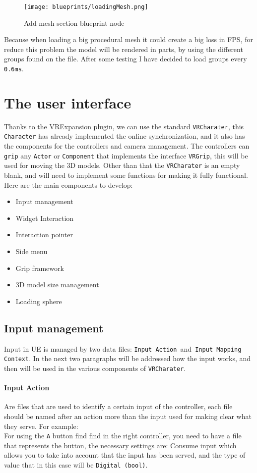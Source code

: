 \begin{figure}[h]
    \centering
    \texttt{[image: blueprints/loadingMesh.png]}
    \caption{Add mesh section blueprint node}
    \label{fig:loadingMesh}
\end{figure}
\noindent
Because when loading a big procedural mesh it could create a big loss in \ac{FPS}, for reduce this problem the model will be rendered in parts, by using the different groups found on the file. After some testing I have decided to load groups every \verb|0.6ms|. 

\section{The user interface}
\noindent
Thanks to the VRExpansion plugin, we can use the standard \verb|VRCharater|, this \verb*|Character| has already implemented the online synchronization, and it also has the components for the controllers and camera management.
The controllers can \verb|grip| any \verb|Actor| or \verb|Component| that implements the interface \verb|VRGrip|, this will be used for  moving the 3D models.
Other than that the \verb|VRCharater| is an empty blank, and will need to implement some functions for making it fully functional.\\
Here are the main components to develop:

\begin{itemize}
    \item Input management
    \item Widget Interaction
    \item Interaction pointer
    \item Side menu
    \item Grip framework
    \item 3D model size management    
    \item Loading sphere
\end{itemize}

\subsection{Input management}
\noindent
Input in \ac{UE} is managed by two data files: \verb|Input Action |and\verb| Input Mapping Context|.
In the next two paragraphs will be addressed how the input works, and then will be used in the various components of \verb|VRCharater|.

\paragraph{Input Action}
Are files that are used to identify a certain input of the controller, each file should be named after an action more than the input used for making clear what they serve.
For example:\\
For using the \verb|A| button find find in the right controller,
you need to have a file that represents the button,
the necessary settings are: Consume input which allows you to take into account that the input has been served,
and the type of value that in this case will be \verb|Digital (bool)|.

